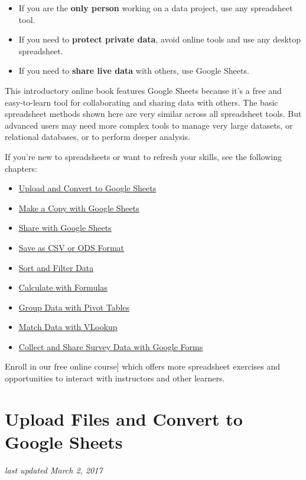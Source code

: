 \documentclass[
  english,
]{book}
\providecommand{\tightlist}{%
  \setlength{\itemsep}{0pt}\setlength{\parskip}{0pt}}
\begin{document}
\begin{itemize}
\tightlist
\item
  If you are the \textbf{only person} working on a data project, use any spreadsheet tool.
\item
  If you need to \textbf{protect private data}, avoid online tools and use any desktop spreadsheet.
\item
  If you need to \textbf{share live data} with others, use Google Sheets.
\end{itemize}

This introductory online book features Google Sheets because it's a free and easy-to-learn tool for collaborating and sharing data with others. The basic spreadsheet methods shown here are very similar across all spreadsheet tools. But advanced users may need more complex tools to manage very large datasets, or relational databases, or to perform deeper analysis.

If you're new to spreadsheets or want to refresh your skills, see the following chapters:

\begin{itemize}
\tightlist
\item
  \href{upload}{Upload and Convert to Google Sheets}
\item
  \href{copy}{Make a Copy with Google Sheets}
\item
  \href{share}{Share with Google Sheets}
\item
  \href{csv}{Save as CSV or ODS Format}
\item
  \href{sort}{Sort and Filter Data}
\item
  \href{calculate}{Calculate with Formulas}
\item
  \href{pivot}{Group Data with Pivot Tables}
\item
  \href{vlookup}{Match Data with VLookup}
\item
  \href{forms}{Collect and Share Survey Data with Google Forms}
\end{itemize}

Enroll in our free online course{]} which offers more spreadsheet exercises and opportunities to interact with instructors and other learners.

\hypertarget{upload}{%
\section{Upload Files and Convert to Google Sheets}\label{upload}}

\emph{last updated March 2, 2017}
\end{document}

